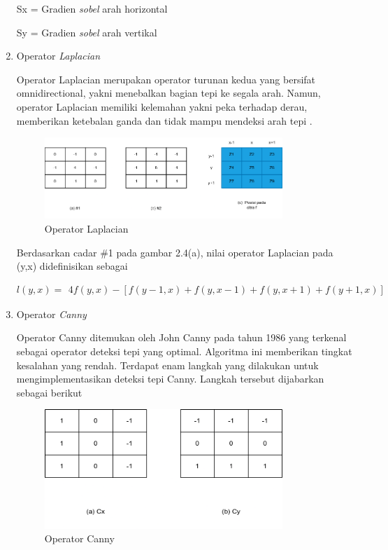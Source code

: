 \begin{enumerate}[leftmargin=1cm, itemindent=0.6cm,labelwidth=15pt, labelsep=5pt, listparindent=1cm,align=left]
Sx = Gradien \textit{sobel} arah horizontal

Sy = Gradien \textit{sobel} arah vertikal

    \item Operator \textit{Laplacian}

    Operator Laplacian merupakan operator turunan kedua yang bersifat omnidirectional, yakni menebalkan bagian tepi ke segala arah. Namun, operator Laplacian memiliki kelemahan yakni peka terhadap derau, memberikan ketebalan ganda dan tidak mampu mendeksi arah tepi \cite{kadir2013pengolahan}.

\begin{figure}[ht]
    \includegraphics[width=0.85\textwidth, center]{images/Laplacian.png}
    \caption{Operator Laplacian}
\end{figure}


    Berdasarkan cadar \#1 pada gambar 2.4(a), nilai operator Laplacian pada (y,x) didefinisikan sebagai

\begin{equation}
l(y,x) =
\begin{aligned}
4f(y,x)-[f(y-1,x)+f(y,x-1)+f(y,x+1)+f(y+1,x)]
\end{aligned}
\end{equation}

    \item Operator \textit{Canny}

    Operator Canny ditemukan oleh John Canny pada tahun 1986 yang terkenal sebagai operator deteksi tepi yang optimal. Algoritma ini memberikan tingkat kesalahan yang rendah. Terdapat enam langkah yang dilakukan untuk mengimplementasikan deteksi tepi Canny. Langkah tersebut dijabarkan sebagai berikut

\begin{figure}[ht]
    \includegraphics[width=0.85\textwidth, center]{images/Canny.png}
    \caption{Operator Canny}
\end{figure}


\end{enumerate}
